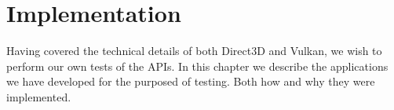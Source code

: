 \chapter{Implementation}\label{ch:implementation}
\begin{chaptermeta}
Having covered the technical details of both Direct3D and Vulkan, we wish to perform our own tests of the \glspl{API}.
In this chapter we describe the applications we have developed for the purposed of testing.
Both how and why they were implemented. 
\end{chaptermeta}